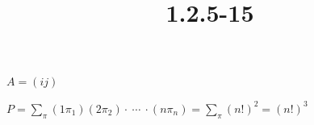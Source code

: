 \documentclass{article}
\title{1.2.5-15}
\begin{document}
\maketitle

\( A = (ij) \)

\( P = \sum_{\pi} (1\pi_1)(2\pi_2) \cdot\ \cdots\ \cdot (n\pi_n) = \sum_{\pi} (n!)^2 = (n!)^3 \)
\end{document}
